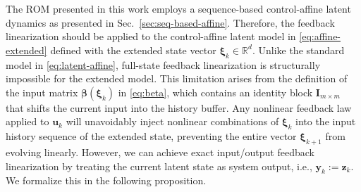 \documentclass{article}
\begin{document}
The ROM presented in this work employs a sequence-based control-affine latent dynamics as presented in Sec.~\ref{sec:seq-based-affine}.
Therefore, the feedback linearization should be applied to the control-affine latent model in \eqref{eq:affine-extended} defined with the extended state vector $\boldsymbol{\xi}_k \in \mathbb{R}^d$.
Unlike the standard model in \eqref{eq:latent-affine}, full-state feedback linearization is structurally impossible for the extended model.
This limitation arises from the definition of the input matrix $\boldsymbol{\beta}(\boldsymbol{\xi}_k)$ in \eqref{eq:beta}, which contains an identity block $\mathbf{I}_{m \times m}$ that shifts the current input into the history buffer.
Any nonlinear feedback law applied to $\mathbf{u}_k$ will unavoidably inject nonlinear combinations of $\boldsymbol{\xi}_k$ into the input history sequence of the extended state, preventing the entire vector $\boldsymbol{\xi}_{k+1}$ from evolving linearly.
However, we can achieve exact input/output feedback linearization by treating the current latent state as system output, i.e., $\mathbf{y}_k :=\mathbf{z}_k$.
We formalize this in the following proposition.
\end{document}
